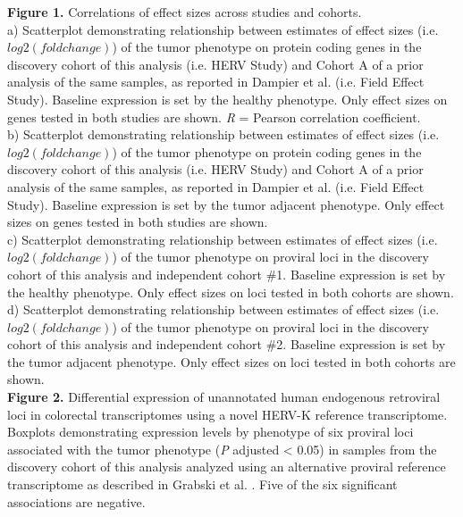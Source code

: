 \textbf{Figure 1.} Correlations of effect sizes across studies and cohorts. \\
a) Scatterplot demonstrating relationship between estimates of effect sizes (i.e. $log2(fold change)$) of the tumor phenotype on protein coding genes in the discovery cohort of this analysis (i.e. HERV Study) and Cohort A of a prior analysis of the same samples, as reported in Dampier et al. \citep{Dampier2020} (i.e. Field Effect Study).
Baseline expression is set by the healthy phenotype.
Only effect sizes on genes tested in both studies are shown.
\emph{R} = Pearson correlation coefficient. \\
b) Scatterplot demonstrating relationship between estimates of effect sizes (i.e. $log2(fold change)$) of the tumor phenotype on protein coding genes in the discovery cohort of this analysis (i.e. HERV Study) and Cohort A of a prior analysis of the same samples, as reported in Dampier et al. \citep{Dampier2020} (i.e. Field Effect Study).
Baseline expression is set by the tumor adjacent phenotype.
Only effect sizes on genes tested in both studies are shown. \\
c) Scatterplot demonstrating relationship between estimates of effect sizes (i.e. $log2(fold change)$) of the tumor phenotype on proviral loci in the discovery cohort of this analysis and independent cohort \#1.
Baseline expression is set by the healthy phenotype.
Only effect sizes on loci tested in both cohorts are shown. \\
d) Scatterplot demonstrating relationship between estimates of effect sizes (i.e. $log2(fold change)$) of the tumor phenotype on proviral loci in the discovery cohort of this analysis and independent cohort \#2.
Baseline expression is set by the tumor adjacent phenotype.
Only effect sizes on loci tested in both cohorts are shown.\\

\textbf{Figure 2.} Differential expression of unannotated human endogenous retroviral loci in colorectal transcriptomes using a novel HERV-K reference transcriptome. \\
Boxplots demonstrating expression levels by phenotype of six proviral loci associated with the tumor phenotype (\emph{P} adjusted < 0.05) in samples from the discovery cohort of this analysis analyzed using an alternative proviral reference transcriptome as described in Grabski et al. \citep{Grabski2020}.
Five of the six significant associations are negative.
